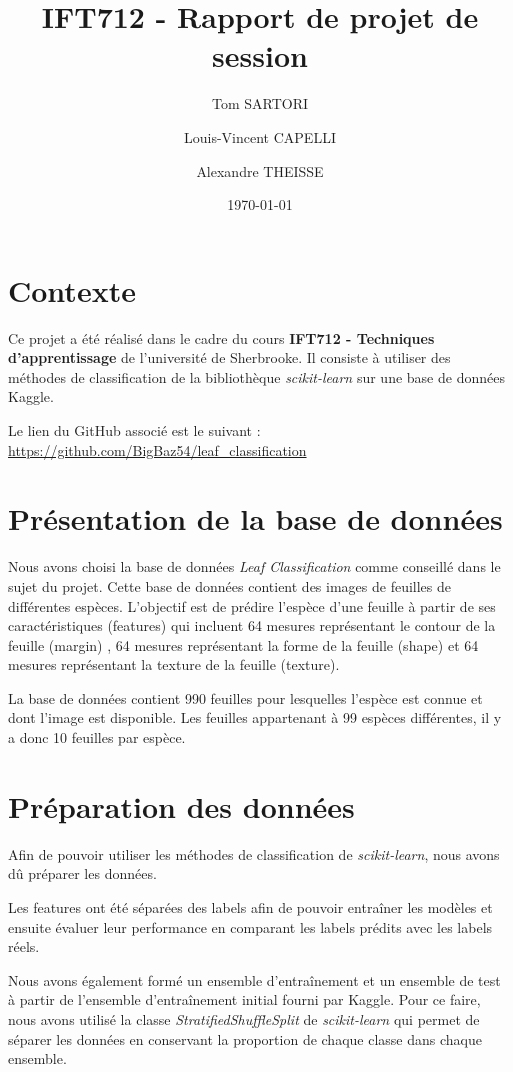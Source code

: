 \documentclass{article}
\title{IFT712 - Rapport de projet de session}
\author{Tom SARTORI \and Louis-Vincent CAPELLI \and Alexandre THEISSE}
\date{\today}
\begin{document}
\maketitle
\newpage

\tableofcontents
\newpage

\section{Contexte}
Ce projet a été réalisé dans le cadre du cours \textbf{IFT712 - Techniques d'apprentissage} de
l'université de Sherbrooke. Il consiste à utiliser des méthodes de classification
de la bibliothèque \textit{scikit-learn} sur une base de données Kaggle.

Le lien du GitHub associé est le suivant : \url{https://github.com/BigBaz54/leaf_classification}


\section{Présentation de la base de données}
Nous avons choisi la base de données \textit{Leaf Classification} \cite{leafKaggle} 
comme conseillé dans le sujet du projet. Cette base de données contient des images de feuilles
de différentes espèces. L'objectif est de prédire l'espèce d'une feuille à partir de ses
caractéristiques (features) qui incluent 64 mesures représentant le contour de la feuille (margin) 
\cite{leafMargin}, 64 mesures représentant la forme de la feuille (shape) et 64 mesures
représentant la texture de la feuille (texture). 

La base de données contient 990 feuilles pour lesquelles l'espèce est connue et dont l'image
est disponible. Les feuilles appartenant à 99 espèces différentes, il y a donc 10 feuilles
par espèce.

\section{Préparation des données}
Afin de pouvoir utiliser les méthodes de classification de \textit{scikit-learn}, nous avons
dû préparer les données. 

Les features ont été séparées des labels afin de pouvoir entraîner les modèles et
ensuite évaluer leur performance en comparant les labels prédits avec les labels réels.

Nous avons également formé un ensemble d'entraînement et un ensemble de test à partir 
de l'ensemble d'entraînement initial fourni par Kaggle. Pour ce faire, nous avons utilisé la classe
\textit{StratifiedShuffleSplit} \cite{SSS} de \textit{scikit-learn} qui permet de séparer les données
en conservant la proportion de chaque classe dans chaque ensemble.
\end{document}
